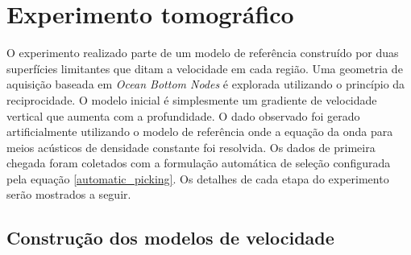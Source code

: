 \section{Experimento tomográfico}

O experimento realizado parte de um modelo de referência construído por duas superfícies limitantes que ditam a velocidade em cada região. Uma geometria de aquisição baseada em \textit{Ocean Bottom Nodes} é explorada utilizando o princípio da reciprocidade. O modelo inicial é simplesmente um gradiente de velocidade vertical que aumenta com a profundidade. O dado observado foi gerado artificialmente utilizando o modelo de referência onde a equação da onda para meios acústicos de densidade constante foi resolvida. Os dados de primeira chegada foram coletados com a formulação automática de seleção configurada pela equação \ref{automatic_picking}. Os detalhes de cada etapa do experimento serão mostrados a seguir. 

\subsection{Construção dos modelos de velocidade}

